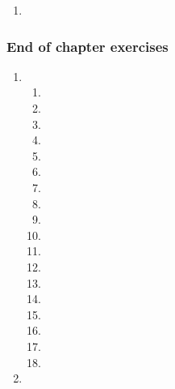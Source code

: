 {\begin{multicols}{3}
\begin{enumerate}[label=\textbf{\arabic*}., noitemsep]
 \item %
\end{enumerate}
\subsubsection*{End of chapter exercises} %
\begin{enumerate}[label=\textbf{\arabic*}., noitemsep]
\item %

\begin{enumerate}[label=\textbf{(\alph*)}, noitemsep]
\item %
\item %
\item %
\item %
\item %
\item %
\item %
\item %
\item %
\item %
\item %
\item %
\item %
\item %
\item %
\item %
\item %
\item %
\end{enumerate}



\item %


\end{enumerate}
\end{multicols}}
